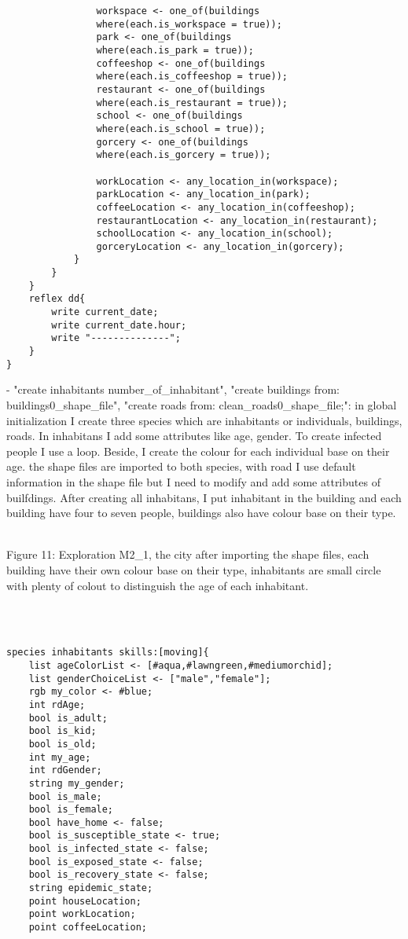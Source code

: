 \documentclass{article}
\begin{document}
\begin{tcolorbox}
\begin{lstlisting}
				workspace <- one_of(buildings 
				where(each.is_workspace = true));
				park <- one_of(buildings 
				where(each.is_park = true));
				coffeeshop <- one_of(buildings 
				where(each.is_coffeeshop = true));
				restaurant <- one_of(buildings 
				where(each.is_restaurant = true));
				school <- one_of(buildings 
				where(each.is_school = true));
				gorcery <- one_of(buildings 
				where(each.is_gorcery = true));
				
				workLocation <- any_location_in(workspace);
				parkLocation <- any_location_in(park);
				coffeeLocation <- any_location_in(coffeeshop);
				restaurantLocation <- any_location_in(restaurant);
				schoolLocation <- any_location_in(school);
				gorceryLocation <- any_location_in(gorcery);
			}
		}
	}
	reflex dd{
		write current_date;
		write current_date.hour;
		write "--------------";
	}
}
\end{lstlisting}
\end{tcolorbox}
\newline
\newline- "create inhabitants number\_of\_inhabitant", "create buildings from: buildings0\_shape\_file", "create roads from: clean\_roads0\_shape\_file;": in global initialization I create three species which are inhabitants or individuals, buildings, roads. In inhabitans I add some attributes like age, gender. To create infected people I use a loop. Beside, I create the colour for each individual base on their age. the shape files are imported to both species, with road I use default information in the shape file but I need to modify and add some attributes of builfdings. After creating all inhabitans, I put inhabitant in the building and each building have four to seven people, buildings also have colour base on their type.
\\
\begin{pic11}
\\
\caption{Figure 11: Exploration M2\_1, the city after importing the shape files, each building have their own colour base on their type, inhabitants are small circle with plenty of colout to distinguish the age of each inhabitant.} 
\end{pic11}
\\\\
\begin{tcolorbox}
\begin{lstlisting}
species inhabitants skills:[moving]{
    list ageColorList <- [#aqua,#lawngreen,#mediumorchid];
    list genderChoiceList <- ["male","female"];
	rgb my_color <- #blue;
	int rdAge;
	bool is_adult;
	bool is_kid;
	bool is_old;
	int my_age;
	int rdGender;
	string my_gender;
	bool is_male;
	bool is_female;
	bool have_home <- false;
	bool is_susceptible_state <- true;
	bool is_infected_state <- false;
	bool is_exposed_state <- false;
	bool is_recovery_state <- false;
	string epidemic_state;
	point houseLocation;
	point workLocation;
	point coffeeLocation;
\end{lstlisting}
\end{tcolorbox}
\end{document}
